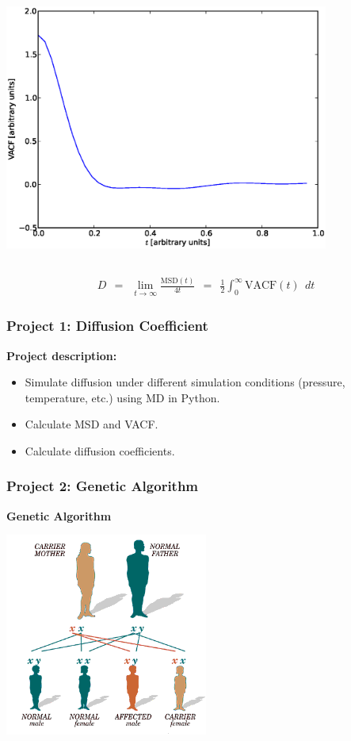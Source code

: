 \documentclass{beamer}
\begin{document}
{\begin{columns}[c]
        \includegraphics[width=0.8\textwidth]{images/diffusion_vacf.eps}

    \end{columns}

    \begin{align*}
        D \ \ = \ \ \lim_{t\rightarrow \infty} \frac{\mathrm{MSD}(t)}{4t}
          \ \ = \ \ \frac{1}{2} \int_0^\infty \mathrm{VACF}(t) \ \ dt
    \end{align*}

}


\frame
{
  \frametitle{Project 1: Diffusion Coefficient}
  {\bf Project description:}

  \smallskip

  \begin{itemize}
    \item Simulate diffusion under different simulation conditions
            (pressure, temperature, etc.) using MD in Python.
    \vspace{0.2in}
    \item Calculate MSD and VACF.
    \vspace{0.2in}
    \item Calculate diffusion coefficients.
  \end{itemize}

}


\frame
{
    \frametitle{Project 2: Genetic Algorithm}

    \centering
    {\bf Genetic Algorithm}

    \begin{center}
        \includegraphics[width=0.5\textwidth]{images/genetics_family.png}
    \end{center}
}
\end{document}
